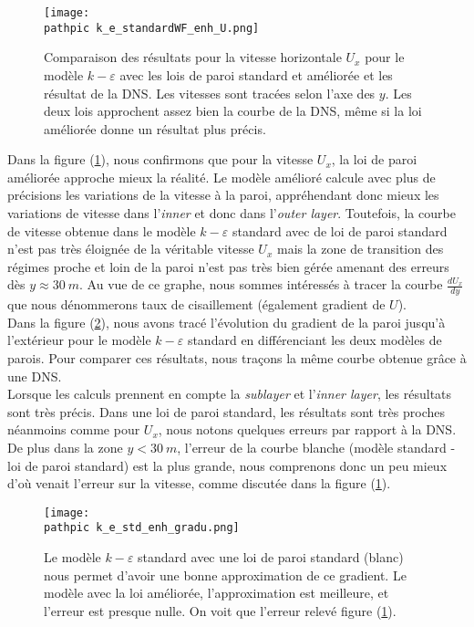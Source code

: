 \documentclass[a4paper,10pt]{article}
\newcommand\pathpic{/home/saura/Documents/Latex_files/Pic/}
\newcommand{\keps}{$k-\varepsilon$}
\newcommand\black{\color{black}}
\begin{document}
 
 \begin{figure}[ht!]
 \centering
 \texttt{[image: \\pathpic k\_e\_standardWF\_enh\_U.png]} 
 \caption{ \footnotesize{ Comparaison des résultats pour la vitesse horizontale $U_x$ pour le modèle \keps $ $ avec les lois de paroi standard et améliorée et les résultat de la DNS. Les vitesses sont tracées selon l'axe des $y$. Les deux lois approchent assez bien la courbe de la DNS, même si la loi améliorée donne un résultat plus précis.}}
 \label{std_U_x_std_enh}
 \end{figure}
 \black
Dans la figure (\ref{std_U_x_std_enh}), nous confirmons que pour la vitesse $U_x$, la loi de paroi améliorée approche mieux la réalité. Le modèle amélioré calcule avec plus de précisions les variations de la vitesse à la paroi, appréhendant donc mieux les variations de vitesse dans l'\textit{inner} et donc dans l'\textit{outer layer}. Toutefois, la courbe de vitesse obtenue dans le modèle \keps $ $ standard avec de loi de paroi standard n'est pas très éloignée de la véritable vitesse $U_x$ mais la zone de transition des régimes proche et loin de la paroi n'est pas très bien gérée amenant des erreurs dès $y \approx 30 \ m$. 
Au vue de ce graphe, nous sommes intéressés à tracer la courbe $\frac{dU_x}{dy}$ que nous dénommerons taux de cisaillement (également gradient de $U$). \\
Dans la figure (\ref{std_grad_std_enh}), nous avons tracé l'évolution du gradient de la paroi jusqu'à l'extérieur pour le modèle \keps $ $ standard en différenciant les deux modèles de parois. Pour comparer ces résultats, nous traçons la même courbe obtenue grâce à une DNS. \\
 Lorsque les calculs prennent en compte la \textit{sublayer} et l'\textit{inner layer}, les résultats sont très précis. Dans une loi de paroi standard, les résultats sont très proches néanmoins comme pour $U_x$, nous notons quelques erreurs par rapport à la DNS. De plus dans la zone $y < 30\ m$, l'erreur de la courbe blanche (modèle standard - loi de paroi standard) est la plus grande, nous comprenons donc un peu mieux d'où venait l'erreur sur la vitesse, comme discutée dans la figure (\ref{std_U_x_std_enh}).

\begin{figure}[ht!]
\centering
\texttt{[image: \\pathpic k\_e\_std\_enh\_gradu.png]}
\caption{\footnotesize{Le modèle \keps$ $ standard avec une loi de paroi standard (blanc) nous permet d'avoir une bonne approximation de ce gradient. Le modèle avec la loi améliorée, l'approximation est meilleure, et l'erreur est presque nulle. On voit que l'erreur relevé figure (\ref{std_U_x_std_enh})}.} 
\label{std_grad_std_enh}
\end{figure}
\end{document}
